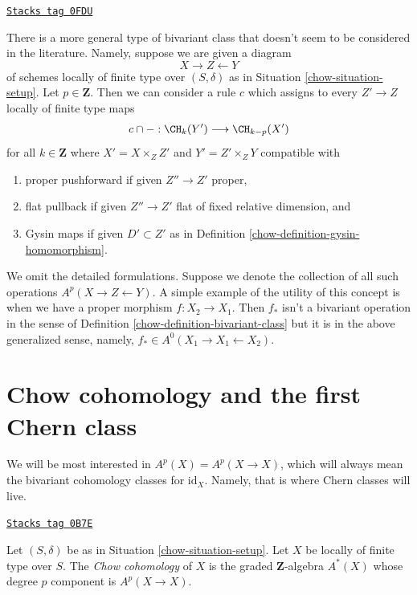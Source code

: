 \begin{remark}
\label{chow-remark-more-general-bivariant}
\href{https://stacks.math.columbia.edu/tag/0FDU}{\texttt{Stacks tag 0FDU}}

There is a more general type of bivariant class that doesn't seem to be
considered in the literature. Namely, suppose we are given a diagram
$$
X \longrightarrow Z \longleftarrow Y
$$
of schemes locally of finite type over $(S, \delta)$ as in
Situation \ref{chow-situation-setup}. Let $p \in \mathbf{Z}$.
Then we can consider a rule $c$ which assigns to every $Z' \to Z$
locally of finite type maps
$$
c \cap - : \CH_k(Y') \longrightarrow \CH_{k - p}(X')
$$
for all $k \in \mathbf{Z}$
where $X' = X \times_Z Z'$ and $Y' = Z' \times_Z Y$ compatible with
\begin{enumerate}
\item proper pushforward if given $Z'' \to Z'$ proper,
\item flat pullback if given $Z'' \to Z'$ flat
of fixed relative dimension, and
\item Gysin maps if given $D' \subset Z'$ as in
Definition \ref{chow-definition-gysin-homomorphism}.
\end{enumerate}
We omit the detailed formulations. Suppose we denote the collection
of all such operations $A^p(X \to Z \leftarrow Y)$. A simple example
of the utility of this concept is when we have a proper morphism
$f : X_2 \to X_1$. Then $f_*$ isn't a bivariant operation in the sense of
Definition \ref{chow-definition-bivariant-class} but it is in the
above generalized sense, namely, $f_* \in A^0(X_1 \to X_1 \leftarrow X_2)$.
\end{remark}

\section{Chow cohomology and the first Chern class}
\label{chow-section-chow-cohomology}
We will be most interested in $A^p(X) = A^p(X \to X)$, which will always mean
the bivariant cohomology classes for $\text{id}_X$. Namely, that is where
Chern classes will live.

\begin{definition}
\label{chow-definition-chow-cohomology}
\href{https://stacks.math.columbia.edu/tag/0B7E}{\texttt{Stacks tag 0B7E}}

Let $(S, \delta)$ be as in Situation \ref{chow-situation-setup}.
Let $X$ be locally of finite type over $S$. The {\it Chow cohomology}
of $X$ is the graded $\mathbf{Z}$-algebra $A^*(X)$ whose degree
$p$ component is $A^p(X \to X)$.
\end{definition}

